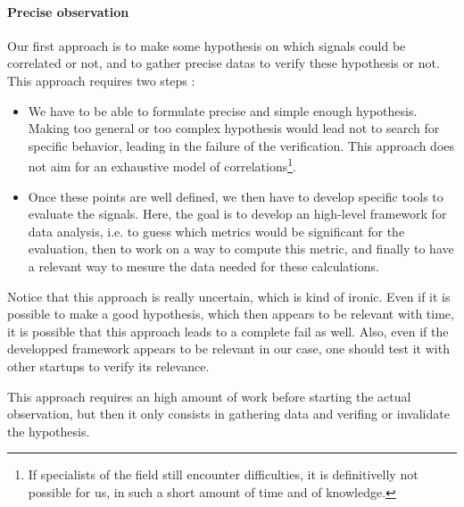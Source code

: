 \documentclass[twoside]{report}
\begin{document}
\paragraph{Precise observation}Our first approach is to make some hypothesis on which signals could be correlated or not, and to gather precise datas to verify these hypothesis or not. This approach requires two steps : 
\begin{itemize}
	\item We have to be able to formulate precise and simple enough hypothesis. Making too general or too complex hypothesis would lead not to search for specific behavior, leading in the failure of the verification. This approach does not aim for an exhaustive model of correlations\footnote{If specialists of the field still encounter difficulties, it is definitivelly not possible for us, in such a short amount of time and of knowledge.}.
	\item Once these points are well defined, we then have to develop specific tools to evaluate the signals. Here, the goal is to develop an high-level framework for data analysis, i.e. to guess which metrics would be significant for the evaluation, then to work on a way to compute this metric, and finally to have a relevant way to mesure the data needed for these calculations.
\end{itemize}
Notice that this approach is really uncertain, which is kind of ironic. Even if it is possible to make a good hypothesis, which then appears to be relevant with time, it is possible that this approach leads to a complete fail as well. Also, even if the developped framework appears to be relevant in our case, one should test it with other startups to verify its relevance.

This approach requires an high amount of work before starting the actual observation, but then it only consists in gathering data and verifing or invalidate the hypothesis.
\end{document}
